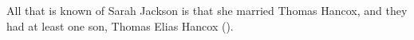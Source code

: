 
All that is known of Sarah Jackson is that she married Thomas Hancox, and they had at least one son, Thomas Elias Hancox ().
